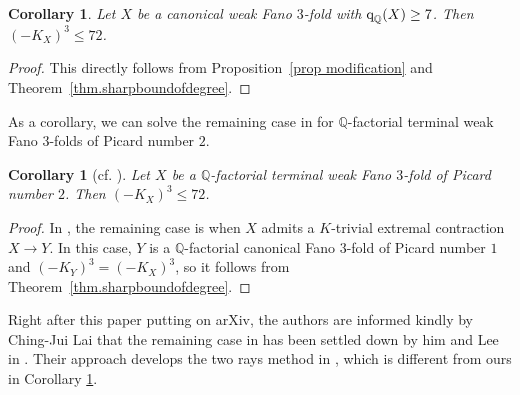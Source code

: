 \documentclass[12pt,twoside]{amsart}
\newcommand{\qQ}{\text{\rm q}_{\mathbb{Q}}}
\newtheorem{cor}[thm]{Corollary}
\theoremstyle{definition}
\begin{document}
\begin{cor}
 Let $X$ be a canonical weak Fano $3$-fold with $\qQ(X)\geq 7$. Then $(-K_X)^3\leq 72$.
\end{cor}

 \begin{proof}
 This directly follows from Proposition~\ref{prop modification} and Theorem~\ref{thm.sharpboundofdegree}.
 \end{proof}
 
As a corollary, we can solve the remaining case in \cite[Main~Theorem]{Lai2021} for $\mathbb{Q}$-factorial terminal weak Fano $3$-folds of Picard number $2$.

\begin{cor}[{cf. \cite[Main~Theorem]{Lai2021}}]\label{cor.pic2}
 Let $X$ be a $\mathbb{Q}$-factorial terminal weak Fano $3$-fold of Picard number $2$. Then $(-K_X)^3\leq 72$.
\end{cor}

\begin{proof}
 In \cite[Main~Theorem]{Lai2021}, the remaining case is when $X$ admits a $K$-trivial extremal contraction $X\to Y$. In this case, $Y$ is a $\mathbb Q$-factorial canonical Fano $3$-fold of Picard number $1$ and $(-K_Y)^3=(-K_X)^3$, so it follows from Theorem~\ref{thm.sharpboundofdegree}.
\end{proof}

Right after this paper putting on arXiv, the authors are informed kindly by  Ching-Jui Lai that the remaining case in \cite[Main~Theorem]{Lai2021} has been settled down by him and Lee in \cite{LaiLee2025}. Their approach develops the two rays method in \cite{Lai2021}, which is different from ours in Corollary \ref{cor.pic2}.
\end{document}

